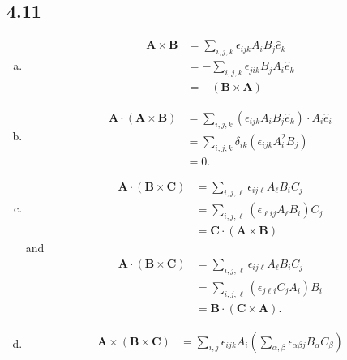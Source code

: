 \documentclass[10pt]{mypackage}
\begin{document}
\subsection{4.11}%
\begin{enumerate}[(a)]
  \item 
    \begin{align*}
      \mathbf{A}\times \mathbf{B} &= \sum_{i,j,k}\epsilon_{ijk}A_iB_j\hat{e}_k\\
                &= -\sum_{i,j,k}\epsilon_{jik}B_jA_i\hat{e}_k\\
                &= -\left(\mathbf{B}\times \mathbf{A}\right)
    \end{align*}
  \item
    \begin{align*}
      \mathbf{A}\cdot \left(\mathbf{A}\times \mathbf{B}\right) &= \sum_{i,j,k}\left(\epsilon_{ijk}A_iB_j\hat{e}_k\right)\cdot A_i\hat{e}_i\\
                                                               &= \sum_{i,j,k}\delta_{ik}\left(\epsilon_{ijk}A_i^2B_j\right)\\
                                                               &= 0.
    \end{align*}
  \item 
    \begin{align*}
      \mathbf{A}\cdot \left(\mathbf{B}\times \mathbf{C}\right) &= \sum_{i,j,\ell}\epsilon_{ij\ell}A_{\ell}B_iC_j\\
                                                               &= \sum_{i,j,\ell}\left(\epsilon_{\ell i j}A_{\ell}B_i\right)C_j\\
                                                               &= \mathbf{C}\cdot \left(\mathbf{A}\times \mathbf{B}\right)
    \end{align*}
    and
    \begin{align*}
      \mathbf{A}\cdot \left(\mathbf{B}\times \mathbf{C}\right) &= \sum_{i,j,\ell}\epsilon_{ij\ell}A_{\ell}B_iC_j\\
                                                               &= \sum_{i,j,\ell}\left(\epsilon_{j \ell i}C_{j}A_{i}\right)B_i\\
                                                               &= \mathbf{B}\cdot \left(\mathbf{C}\times \mathbf{A}\right).
    \end{align*}
  \item 
    \begin{align*}
      \mathbf{A}\times \left(\mathbf{B}\times \mathbf{C}\right) &= \sum_{i,j}\epsilon_{ijk}A_i\left(\sum_{\alpha,\beta}\epsilon_{\alpha \beta j}B_{\alpha}C_{\beta}\right)\\

\end{align*}
\end{enumerate}
\end{document}
